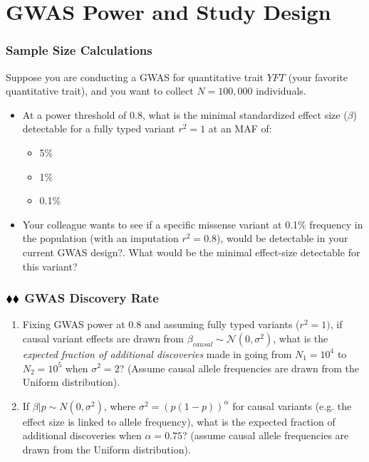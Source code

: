 \documentclass{pset}
\date{6/8/2025}
\begin{document}
\maketitle

\section*{GWAS Power and Study Design}

\subsubsection*{Sample Size Calculations}

Suppose you are conducting a GWAS for quantitative trait $YFT$ (your favorite quantitative trait), and you want to collect $N=100,000$ individuals. 

\begin{itemize}
	\item At a power threshold of $0.8$, what is the minimal standardized effect size ($\beta$) detectable for a fully typed variant $r^2 = 1$ at an MAF of: 
	\begin{itemize}
		\item 5\% 
		\item 1\%
		\item 0.1\%
	\end{itemize}
	\item Your colleague wants to see if a specific missense variant at 0.1\% frequency in the population (with an imputation $r^2 = 0.8$), would be detectable in your current GWAS design?. What would be the minimal effect-size detectable for this variant?  
\end{itemize}

\subsubsection*{$\mathbin{\blacklozenge}\mathbin{\blacklozenge}$ GWAS Discovery Rate} 

\begin{enumerate}
\item Fixing GWAS power at $0.8$ and assuming fully typed variants ($r^2 = 1)$, if causal variant effects are drawn from $\beta_{causal} \sim \mathcal{N}(0,\sigma^2)$, what is the \textit{expected fraction of additional discoveries} made in going from $N_1 = 10^4$ to $N_2 = 10^5$ when $\sigma^2 = 2$? (Assume causal allele frequencies are drawn from the Uniform distribution). 
	
\item If $\beta | p \sim N(0, \sigma^2)$, where $\sigma^2 = \left(p(1-p)\right)^{\alpha}$ for causal variants (e.g. the effect size is linked to allele frequency), what is the expected fraction of additional discoveries when $\alpha = 0.75$? (assume causal allele frequencies are drawn from the Uniform distribution).
\end{enumerate}
\end{document}
